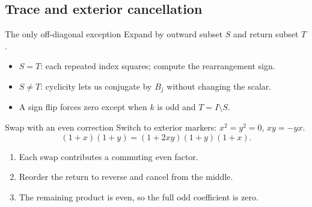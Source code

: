 \documentclass{beamer}
\begin{document}
\subsection{Trace and exterior cancellation}
\begin{frame}{The only off-diagonal exception}
  Expand by outward subset $S$ and return subset $T$.
  \begin{itemize}
    \item $S=T$: each repeated index squares; compute the rearrangement sign.
    \item $S\ne T$: cyclicity lets us conjugate by $B_j$ without changing the scalar.
    \item A sign flip forces zero except when $k$ is odd and $T=I\setminus S$.
  \end{itemize}
\end{frame}
\begin{frame}{Swap with an even correction}
  Switch to exterior markers: $x^2=y^2=0$, $xy=-yx$.
  \[
    (1+x)(1+y)=(1+2xy)(1+y)(1+x).
  \]
  \begin{enumerate}
    \item Each swap contributes a commuting even factor.
    \item Reorder the return to reverse and cancel from the middle.
    \item The remaining product is even, so the full odd coefficient is zero.
  \end{enumerate}
\end{frame}
\end{document}
